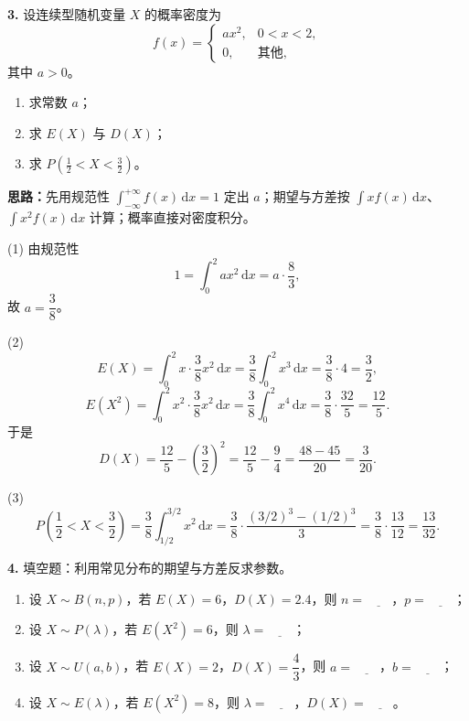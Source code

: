 
\else \answerarea[8] \fi

\textbf{3.} 设连续型随机变量 $X$ 的概率密度为
\[
f(x)=\begin{cases}
ax^2, & 0<x<2,\\
0, & \text{其他},
\end{cases}
\]
其中 $a>0$。
\begin{enumerate}[label=(\arabic*)]
    \item 求常数 $a$；
    \item 求 $E(X)$ 与 $D(X)$；
    \item 求 $P\!\left(\frac12<X<\frac32\right)$。
\end{enumerate}

\ifshowsolutions%
\textbf{思路：}先用规范性 $\int_{-\infty}^{+\infty}f(x)\,\mathrm{d}x=1$ 定出 $a$；期望与方差按 $\int xf(x)\,\mathrm{d}x$、$\int x^2f(x)\,\mathrm{d}x$ 计算；概率直接对密度积分。

(1) 由规范性
\[
1=\int_0^2 ax^2\,\mathrm{d}x=a\cdot\frac{8}{3},
\]
故 $a=\dfrac{3}{8}$。

(2)
\[
E(X)=\int_0^2 x\cdot\frac38x^2\,\mathrm{d}x=\frac38\int_0^2x^3\,\mathrm{d}x=\frac38\cdot4=\frac32,
\]
\[
E(X^2)=\int_0^2 x^2\cdot\frac38x^2\,\mathrm{d}x=\frac38\int_0^2x^4\,\mathrm{d}x=\frac38\cdot\frac{32}{5}=\frac{12}{5}.
\]
于是
\[
D(X)=\frac{12}{5}-\left(\frac32\right)^2=\frac{12}{5}-\frac94=\frac{48-45}{20}=\frac{3}{20}.
\]

(3)
\[
P\!\left(\frac12<X<\frac32\right)
=\frac38\int_{1/2}^{3/2}x^2\,\mathrm{d}x
=\frac38\cdot\frac{(3/2)^3-(1/2)^3}{3}
=\frac38\cdot\frac{13}{12}
=\frac{13}{32}.
\]


\else \answerarea[8] \fi

\textbf{4.} 填空题：利用常见分布的期望与方差反求参数。
\begin{enumerate}[label=(\arabic*)]
    \item 设 $X\sim B(n,p)$，若 $E(X)=6$，$D(X)=2.4$，则 $n=\underline{\qquad}$，$p=\underline{\qquad}$；
    \item 设 $X\sim P(\lambda)$，若 $E(X^2)=6$，则 $\lambda=\underline{\qquad}$；
    \item 设 $X\sim U(a,b)$，若 $E(X)=2$，$D(X)=\dfrac43$，则 $a=\underline{\qquad}$，$b=\underline{\qquad}$；
    \item 设 $X\sim E(\lambda)$，若 $E(X^2)=8$，则 $\lambda=\underline{\qquad}$，$D(X)=\underline{\qquad}$。
\end{enumerate}

